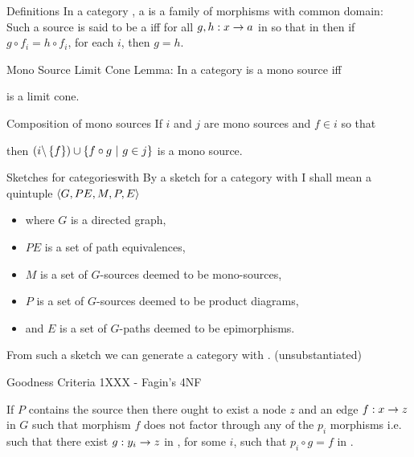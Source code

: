 
\begin{frame}{Definitions} 
In a category \catc, a   is a family of morphisms with common domain: \\
\medskip
Such a source is said to be a   iff for all $g,h:x \rightarrow a$ in \catcw 
so that  
in \catcw then if $g \circ f_i = h \circ f_i$, for each $i$,  then $g=h$.
\end{frame}

\begin{frame}{Mono Source Limit Cone}  %
Lemma: In a category 
\scalebox{0.65}{

} is a mono source iff \\
\begin{center}
\scalebox{0.65}{

} 
is a limit cone.
\end{center}
\end{frame}

\begin{frame}{Composition of mono sources}
If $i$ and $j$ are mono sources and $f \in i$ so that
\begin{center}
\scalebox{0.65}{

}
\end{center}
then $(i \backslash \left\{f\right\}) \cup \left\{f \circ g \ \middle|\ g \in j\right\}$ is a mono source.
\end{frame}

\begin{frame}{Sketches for categories}{with \thirdstructure }
By a sketch for a category with \thirdstructure I shall mean a quintuple
$\langle G,PE,M,P,E\rangle$
\begin{itemize}
\item  where $G$ is a directed graph, 
\item  $PE$ is a set of path equivalences, 
\item  $M$ is a set of $G$-sources deemed to be mono-sources,
\item  $P$ is a set of $G$-sources deemed to be product diagrams, 
\item  and $E$ is a set of $G$-paths deemed to be epimorphisms.
\end{itemize}
\medskip
From such a sketch we can generate a category with \thirdstructure.  \pause (unsubstantiated)   
\end{frame}

\begin{frame}{Goodness Criteria 1XXX - Fagin's 4NF}
\IfSforproductepimonoCwithRCwords

 If $P$ contains the source  
then there ought to exist a node $z$ and an edge $f: x \rightarrow z$ in $G$ such that morphism $f$ does not factor through any of the $p_i$ morphisms 
i.e. such that there exist $g: y_i \rightarrow z$ in \catcw, for some $i$, such that $p_i\circ g = f$ in \catc. 
\end{frame}

